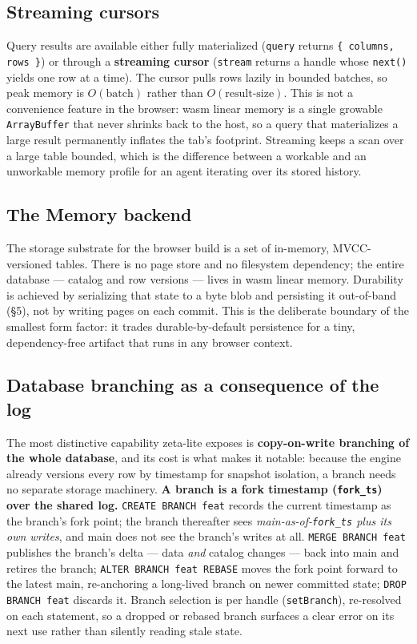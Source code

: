 \documentclass[11pt]{article}
\begin{document}
\subsection{Streaming cursors}

Query results are available either fully materialized (\texttt{query} returns
\texttt{\{ columns, rows \}}) or through a \textbf{streaming cursor}
(\texttt{stream} returns a handle whose \texttt{next()} yields one row at a time).
The cursor pulls rows lazily in bounded batches, so peak memory is $O(\text{batch})$
rather than $O(\text{result-size})$. This is not a convenience feature in the
browser: wasm linear memory is a single growable \texttt{ArrayBuffer} that never
shrinks back to the host, so a query that materializes a large result permanently
inflates the tab's footprint. Streaming keeps a scan over a large table bounded,
which is the difference between a workable and an unworkable memory profile for an
agent iterating over its stored history.

\subsection{The Memory backend}

The storage substrate for the browser build is a set of in-memory, MVCC-versioned
tables. There is no page store and no filesystem dependency; the entire database ---
catalog and row versions --- lives in wasm linear memory. Durability is achieved by
serializing that state to a byte blob and persisting it out-of-band (\S5), not by
writing pages on each commit. This is the deliberate boundary of the smallest form
factor: it trades durable-by-default persistence for a tiny, dependency-free
artifact that runs in any browser context.

\subsection{Database branching as a consequence of the log}

The most distinctive capability zeta-lite exposes is \textbf{copy-on-write branching
of the whole database}, and its cost is what makes it notable: because the engine
already versions every row by timestamp for snapshot isolation, a branch needs no
separate storage machinery. \textbf{A branch is a fork timestamp
(\texttt{fork\_ts}) over the shared log.} \texttt{CREATE BRANCH feat} records the
current timestamp as the branch's fork point; the branch thereafter sees
\emph{main-as-of-\texttt{fork\_ts} plus its own writes}, and main does not see the
branch's writes at all. \texttt{MERGE BRANCH feat} publishes the branch's delta ---
data \emph{and} catalog changes --- back into main and retires the branch;
\texttt{ALTER BRANCH feat REBASE} moves the fork point forward to the latest main,
re-anchoring a long-lived branch on newer committed state; \texttt{DROP BRANCH feat}
discards it. Branch selection is per handle (\texttt{setBranch}), re-resolved on
each statement, so a dropped or rebased branch surfaces a clear error on its next
use rather than silently reading stale state.
\end{document}
